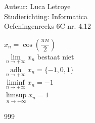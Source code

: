 \documentclass[a4paper]{article}
\begin{document}
  
\noindent \large Auteur: Luca Letroye \\
\noindent \large Studierichting: Informatica\\
\noindent \large Oefeningenreeks 6C nr. 4.12

\medskip
\normalsize

$x_n = \cos\left(\dfrac{\pi n}{2}\right)$\\

$\lim\limits_{n \rightarrow +\infty} x_n $ bestaat niet\\

$\operatorname*{adh}\limits_{n \rightarrow +\infty} x_n = \{-1,0,1\}$\\

$\liminf\limits_{n \rightarrow +\infty} x_n = -1$\\

$\limsup\limits_{n \rightarrow +\infty} x_n = 1$\\






\begin{thebibliography}{999}
\end{thebibliography}
\end{document}
